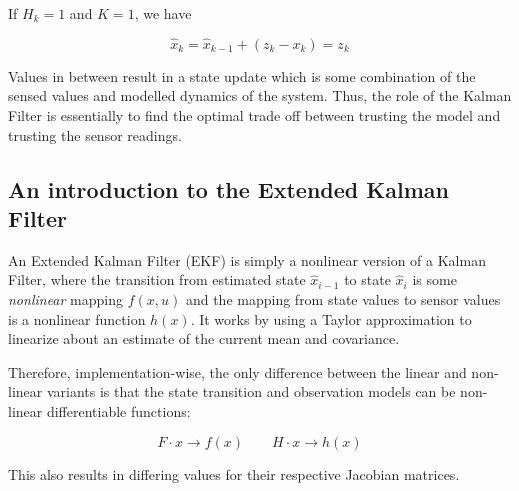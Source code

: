 If $H_k = 1$ and $K = 1$, we have

\[ \hat{x}_k = \hat{x}_{k-1} + (z_k - x_k) = z_k \]

Values in between result in a state update which is some combination of the sensed values and modelled dynamics of the system. Thus, the role of the Kalman Filter is essentially to find the optimal trade off between trusting the model and trusting the sensor readings.

\subsection{An introduction to the Extended Kalman Filter}
An Extended Kalman Filter (EKF) is simply a nonlinear version of a Kalman Filter, where the transition from estimated state $\hat{x}_{i-1}$ to state $\hat{x}_i$ is some \emph{nonlinear} mapping $f(x, u)$ and the mapping from state values to sensor values is a nonlinear function $h(x)$. It works by using a Taylor approximation to linearize about an estimate of the current mean and covariance.

Therefore, implementation-wise, the only difference between the linear and non-linear variants is that the state transition and observation models can be non-linear differentiable functions:

\[ F \cdot x \rightarrow f(x) \qquad H\cdot x \rightarrow h(x) \]

This also results in differing values for their respective Jacobian matrices.
